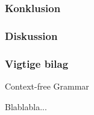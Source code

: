 \subsubsection*{Konklusion}

\subsubsection*{Diskussion}

\subsubsection*{Vigtige bilag}
\begin{itemize_small}
    \item Context-free Grammar
    \item Blablabla...
\end{itemize_small}

